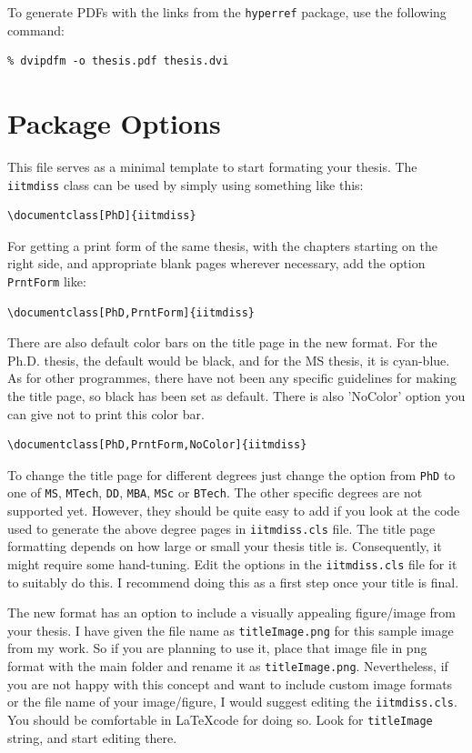 To generate PDFs with the links from the \verb+hyperref+ package, use the following command:
\begin{verbatim}
% dvipdfm -o thesis.pdf thesis.dvi
\end{verbatim}

\section{Package Options}

This file serves as a minimal template to start formating your thesis. The \verb+iitmdiss+ class can be used by simply using something like this:
\begin{verbatim}
\documentclass[PhD]{iitmdiss}  
\end{verbatim}

For getting a print form of the same thesis, with the chapters starting on the right side, and appropriate blank pages wherever necessary, add the option \verb+PrntForm+ like:
\begin{verbatim}
\documentclass[PhD,PrntForm]{iitmdiss}  
\end{verbatim}

There are also default color bars on the title page in the new format. For the Ph.D. thesis, the default would be black, and for the MS thesis, it is cyan-blue. As for other programmes, there have not been any specific guidelines for making the title page, so black has been set as default. There is also 'NoColor' option you can give not to print this color bar.

\begin{verbatim}
\documentclass[PhD,PrntForm,NoColor]{iitmdiss}  
\end{verbatim}

To change the title page for different degrees just change the option from \verb+PhD+ to one of \verb+MS+, \verb+MTech+, \verb+DD+, \verb+MBA+, \verb+MSc+ or \verb+BTech+. The other specific degrees are not supported yet. However, they should be quite easy to add if you look at the code used to generate the above degree pages in \verb+iitmdiss.cls+ file.  The title page formatting depends on how large or small your thesis title is.  Consequently, it might require some hand-tuning.  Edit the options in the \verb+iitmdiss.cls+ file for it to suitably do this. I recommend doing this as a first step once your title is final.

The new format has an option to include a visually appealing figure/image from your thesis. I have given the file name as \verb+titleImage.png+ for this sample image from my work. So if you are planning to use it, place that image file in png format with the main folder and rename it as \verb+titleImage.png+. Nevertheless, if you are not happy with this concept and want to include custom image formats or the file name of your image/figure, I would suggest editing the \verb+iitmdiss.cls+. You should be comfortable in \LaTeX code for doing so. Look for \verb+titleImage+ string, and start editing there.

